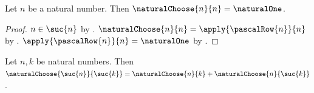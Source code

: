 \begin{proposition}\label{natural_choose_last}
    Let $n$ be a natural number.
    Then $\naturalChoose{n}{n}=\naturalOne$.
\end{proposition}
\begin{proof}
    $n\in\suc{n}$ by .
    $\naturalChoose{n}{n}=\apply{\pascalRow{n}}{n}$ by
        .
    $\apply{\pascalRow{n}}{n}=\naturalOne$ by
        .
\end{proof}

\begin{theorem}\label{natural_choose_pascal}
    Let $n,k$ be natural numbers.
    Then
        $\naturalChoose{\suc{n}}{\suc{k}}
            =\naturalChoose{n}{k}+\naturalChoose{n}{\suc{k}}$.
\end{theorem}
